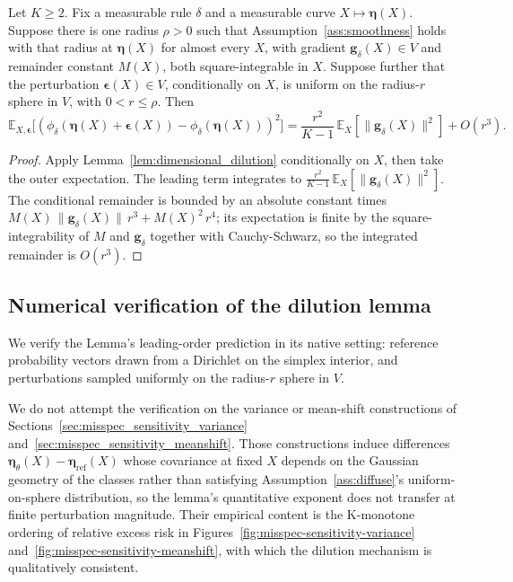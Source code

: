 \begin{corollary}\label{cor:integrated_dilution}
    Let $K \geq 2$. Fix a measurable rule $\delta$ and a measurable curve $X \mapsto \boldsymbol{\eta}(X)$. Suppose there is one radius $\rho > 0$ such that Assumption~\ref{ass:smoothness} holds with that radius at $\boldsymbol{\eta}(X)$ for almost every $X$, with gradient $\mathbf{g}_\delta(X) \in V$ and remainder constant $M(X)$, both square-integrable in $X$. Suppose further that the perturbation $\boldsymbol{\epsilon}(X) \in V$, conditionally on $X$, is uniform on the radius-$r$ sphere in $V$, with $0 < r \leq \rho$. Then
    \begin{equation}\label{eq:integrated_dilution}
        \mathbb{E}_{X,\boldsymbol{\epsilon}}\!\bigl[(\phi_\delta(\boldsymbol{\eta}(X) + \boldsymbol{\epsilon}(X)) - \phi_\delta(\boldsymbol{\eta}(X)))^2\bigr] = \frac{r^2}{K-1}\,\mathbb{E}_X[\|\mathbf{g}_\delta(X)\|^2] + O(r^3).
    \end{equation}
\end{corollary}

\begin{proof}
    Apply Lemma~\ref{lem:dimensional_dilution} conditionally on $X$, then take the outer expectation. The leading term integrates to $\frac{r^2}{K-1}\,\mathbb{E}_X[\|\mathbf{g}_\delta(X)\|^2]$. The conditional remainder is bounded by an absolute constant times $M(X)\,\|\mathbf{g}_\delta(X)\|\,r^3 + M(X)^2\,r^4$; its expectation is finite by the square-integrability of $M$ and $\mathbf{g}_\delta$ together with Cauchy-Schwarz, so the integrated remainder is $O(r^3)$.
\end{proof}

\subsection{Numerical verification of the dilution lemma}\label{sec:misspec_sensitivity_lemma_verification}

We verify the Lemma's leading-order prediction in its native setting: reference probability vectors drawn from a Dirichlet on the simplex interior, and perturbations sampled uniformly on the radius-$r$ sphere in $V$.

We do not attempt the verification on the variance or mean-shift constructions of Sections~\ref{sec:misspec_sensitivity_variance} and~\ref{sec:misspec_sensitivity_meanshift}. Those constructions induce differences $\boldsymbol{\eta}_\theta(X) - \boldsymbol{\eta}_{\mathrm{ref}}(X)$ whose covariance at fixed $X$ depends on the Gaussian geometry of the classes rather than satisfying Assumption~\ref{ass:diffuse}'s uniform-on-sphere distribution, so the lemma's quantitative exponent does not transfer at finite perturbation magnitude. Their empirical content is the K-monotone ordering of relative excess risk in Figures~\ref{fig:misspec-sensitivity-variance} and~\ref{fig:misspec-sensitivity-meanshift}, with which the dilution mechanism is qualitatively consistent.

